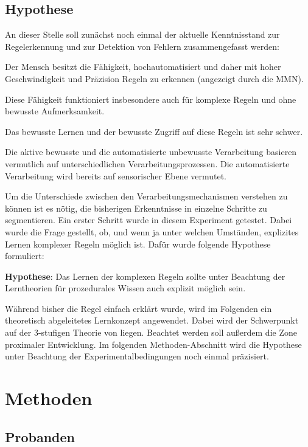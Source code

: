 \documentclass[doc,a4paper,12pt]{apa6}
\begin{document}
\subsection{Hypothese}

An dieser Stelle soll zunächst noch einmal der aktuelle Kenntnisstand zur Regelerkennung und zur Detektion von Fehlern zusammengefasst werden:

\begin{compactitem}
\item Der Mensch besitzt die Fähigkeit, hochautomatisiert und daher mit hoher Geschwindigkeit und Präzision Regeln zu erkennen (angezeigt durch die MMN).
\item Diese Fähigkeit funktioniert insbesondere auch für komplexe Regeln und ohne bewusste Aufmerksamkeit.
\item Das bewusste Lernen und der bewusste Zugriff auf diese Regeln ist sehr schwer.
\item Die aktive bewusste und die automatisierte unbewusste Verarbeitung basieren vermutlich auf unterschiedlichen Verarbeitungsprozessen. Die automatisierte Verarbeitung wird bereits auf sensorischer Ebene vermutet.
\end{compactitem}

Um die Unterschiede zwischen den Verarbeitungsmechanismen verstehen zu können ist es nötig, die bisherigen Erkenntnisse in einzelne Schritte zu segmentieren. Ein erster Schritt wurde in diesem Experiment getestet. Dabei wurde die Frage gestellt, ob, und wenn ja unter welchen Umständen, explizites Lernen komplexer Regeln möglich ist. Dafür wurde folgende Hypothese formuliert:

\textbf{Hypothese}: Das Lernen der komplexen Regeln sollte unter Beachtung der Lerntheorien für prozedurales Wissen auch explizit möglich sein.

Während bisher die Regel einfach erklärt wurde, wird im Folgenden ein theoretisch abgeleitetes Lernkonzept angewendet. Dabei wird der Schwerpunkt auf der 3-stufigen Theorie von \textcite{fitts1967human} liegen. Beachtet werden soll außerdem die Zone proximaler Entwicklung. Im folgenden Methoden-Abschnitt wird die Hypothese unter Beachtung der Experimentalbedingungen noch einmal präzisiert.

\section{Methoden}

\subsection{Probanden}
\end{document}
